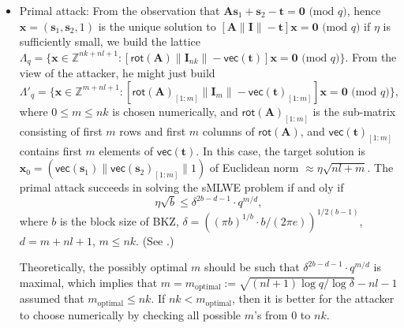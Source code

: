 \documentclass[conference]{IEEEtran}
\begin{document}
		\begin{itemize}
			\item Primal attack: From the observation that $\mathbf{A}\mathbf{s}_1+\mathbf{s}_2-\mathbf{t}=\mathbf{0} \text{ (mod } q)$, hence $\mathbf{x}=(\mathbf{s}_1,\mathbf{s}_2, 1)$ is the unique solution to $[\mathbf{A}\|\mathbf{I}\|-\mathbf{t}]\mathbf{x}=\mathbf{0} \text{ (mod } q)$ if $\eta$ is sufficiently small, we build the lattice $\Lambda_q=\{\mathbf{x} \in\mathbb{Z}^{nk+nl+1}: [\textsf{rot}(\mathbf{A})\| \mathbf{I}_{nk} \|-\textsf{vec}(\mathbf{t})]\mathbf{x}=\mathbf{0} \text{ (mod } q)\}$. From the view of the attacker, he might just build
			$\Lambda'_q=\{\mathbf{x} \in\mathbb{Z}^{m+nl+1}: [\textsf{rot}(\mathbf{A})_{[1:m]}\| \mathbf{I}_{m} \|-\textsf{vec}(\mathbf{t})_{[1:m]}]\mathbf{x}=\mathbf{0} \text{ (mod } q)\}$, where $0 \leq m\leq nk$ is chosen numerically, and $\textsf{rot}(\mathbf{A})_{[1:m]}$ is the sub-matrix consisting of first $m$ rows and first $m$ columns of $\textsf{rot}(\mathbf{A})$, and $\textsf{vec}(\mathbf{t})_{[1:m]}$ contains first $m$ elements of $\textsf{vec}(\mathbf{t})$. In this case, the target solution is $\mathbf{x}_0=(\textsf{vec}(\mathbf{s}_1)\| \textsf{vec}(\mathbf{s}_2)_{[1:m]}\| 1)$ of Euclidean norm $\approx \eta\sqrt{nl+m}$.
			The primal attack succeeds in solving the \textsf{sMLWE} problem if and oly if
			\begin{equation}\label{k7}
			\eta \sqrt{b}\leq \delta^{2b-d-1}\cdot q^{m/d},
			\end{equation}
			where $b$ is the  block size of BKZ, $\delta=\left((\pi b)^{1/b}\cdot b/(2\pi e)\right)^{1/2(b-1)}$, $d=m+nl+1$, $m\leq nk$.	(See \cite[Subsection 4.2]{AAB+19}.) 
			
Theoretically, the possibly optimal $m$ should be such that  $\delta^{2b-d-1}\cdot q^{m/d}$ is maximal, which implies that $m=m_{\textrm{optimal}}:=\sqrt{(nl+1)\log q/\log \delta}-nl-1$ assumed that $m_{\textrm{optimal}}\leq nk$. If $nk < m_{\textrm{optimal}}$, then  it is better for the attacker to choose numerically by checking all possible $m$'s from $0$ to $nk$. 
			

\end{itemize}
\end{document}
